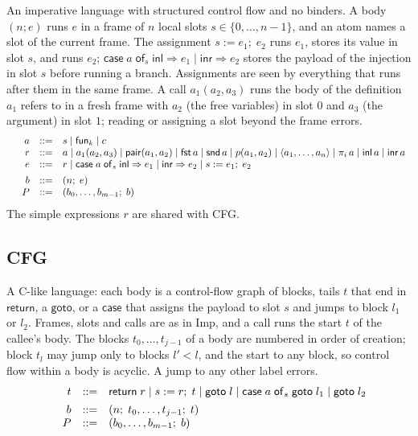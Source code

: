 \documentclass[10pt]{article}
\makeatletter
\theoremstyle{acmplain}
\newcommand{\key}[1]{\mathsf{#1}}
\newcommand{\inl}{\key{inl}\,}
\newcommand{\inr}{\key{inr}\,}
\newcommand{\tuple}[1]{\langle #1 \rangle}
\newcommand{\prj}[1]{\pi_{#1}\,}
\newcommand{\funref}[1]{\key{fun}_{#1}}
\newcommand{\pair}[2]{\key{pair}(#1, #2)}
\newcommand{\FST}{\key{fst}\,}
\newcommand{\SND}{\key{snd}\,}
\newcommand{\prim}[3]{#1(#2, #3)}
\newcommand{\assign}[3]{#1 \mathrel{:=} #2;\; #3}
\newcommand{\Casei}[4]{\key{case}\;#1\;\key{of}_{#2}\;\key{inl} \Rightarrow #3 \mid \key{inr} \Rightarrow #4}
\newenvironment{syntax}{\[\begin{array}{l@{\quad}rcl}}{\end{array}\]}
\makeatother
\begin{document}
An imperative language with structured control flow and no binders. A
body $(n; e)$ runs $e$ in a frame of $n$ local slots $s \in \{0, \ldots,
n-1\}$, and an atom names a slot of the current frame. The assignment
$\assign{s}{e_1}{e_2}$ runs $e_1$, stores its value in slot $s$, and runs
$e_2$; $\Casei{a}{s}{e_1}{e_2}$ stores the payload of the injection in slot
$s$ before running a branch. Assignments are seen by everything that
runs after them in the same frame. A call $a_1(a_2, a_3)$ runs the body
of the definition $a_1$ refers to in a fresh frame with $a_2$ (the free
variables) in slot $0$ and $a_3$ (the argument) in slot $1$; reading or
assigning a slot beyond the frame errors.
\begin{syntax}
  & a &::=& s \mid \funref{k} \mid c \\
  & r &::=& a \mid a_1(a_2, a_3) \mid \pair{a_1}{a_2} \mid \FST a \mid \SND a
    \mid \prim{p}{a_1}{a_2}
    \mid \tuple{a_1,\ldots,a_n} \mid \prj{i} a
    \mid \inl a \mid \inr a \\
  & e &::=& r \mid \Casei{a}{s}{e_1}{e_2}
    \mid \assign{s}{e_1}{e_2} \\[1ex]
  & b &::=& (n;\; e) \\
  & P &::=& (b_0, \ldots, b_{m-1};\; b)
\end{syntax}
The simple expressions $r$ are shared with CFG.

\subsection{CFG}

A C-like language: each body is a control-flow graph of blocks, tails
$t$ that end in $\key{return}$, a $\key{goto}$, or a $\key{case}$ that
assigns the payload to slot $s$ and jumps to block $l_1$ or $l_2$. Frames,
slots and calls are as in Imp, and a call runs the start $t$ of the
callee's body. The blocks $t_0, \ldots, t_{j-1}$ of a body are numbered
in order of creation; block $t_l$ may jump only to blocks $l' < l$, and
the start to any block, so control flow within a body is acyclic. A
jump to any other label errors.
\begin{syntax}
  & t &::=& \key{return}\; r \mid \assign{s}{r}{t} \mid \key{goto}\; l
    \mid \key{case}\;a\;\key{of}_{s}\;\key{goto}\;l_1 \mid \key{goto}\;l_2 \\[1ex]
  & b &::=& (n;\; t_0, \ldots, t_{j-1};\; t) \\
  & P &::=& (b_0, \ldots, b_{m-1};\; b)
\end{syntax}
\end{document}
